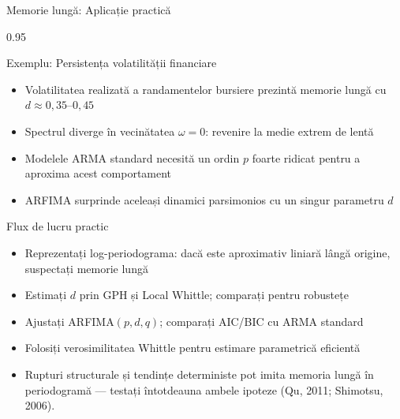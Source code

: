 \documentclass[9pt, aspectratio=169, t]{beamer}
\begin{document}
\begin{frame}{Memorie lungă: Aplicație practică}
    \begin{cminipage}{0.95\textwidth}
    \vspace{-2mm}
    \begin{block}{Exemplu: Persistența volatilității financiare}
        {\small
        \begin{itemize}\setlength{\itemsep}{-1pt}
            \item Volatilitatea realizată a randamentelor bursiere prezintă memorie lungă cu $d \approx 0{,}35$--$0{,}45$
            \item Spectrul diverge în vecinătatea $\omega = 0$: revenire la medie extrem de lentă
            \item Modelele ARMA standard necesită un ordin $p$ foarte ridicat pentru a aproxima acest comportament
            \item ARFIMA surprinde aceleași dinamici parsimonios cu un singur parametru $d$
        \end{itemize}
        }
    \end{block}
    \vspace{-3mm}
    \begin{exampleblock}{Flux de lucru practic}
        \begin{itemize}\setlength{\itemsep}{-1pt}
            \item[\textcolor{MainBlue}{\textbf{1.}}] Reprezentați log-periodograma: dacă este aproximativ liniară lângă origine, suspectați memorie lungă
            \item[\textcolor{MainBlue}{\textbf{2.}}] Estimați $d$ prin GPH și Local Whittle; comparați pentru robustețe
            \item[\textcolor{MainBlue}{\textbf{3.}}] Ajustați ARFIMA$(p,d,q)$; comparați AIC/BIC cu ARMA standard
            \item[\textcolor{MainBlue}{\textbf{4.}}] Folosiți verosimilitatea Whittle pentru estimare parametrică eficientă
        \end{itemize}
    \end{exampleblock}
    \vspace{-2mm}
    \begin{itemize}\setlength{\itemsep}{0pt}
        \item[\textbf{Atenție}:] Rupturi structurale și tendințe deterministe pot imita memoria lungă în periodogramă --- testați întotdeauna ambele ipoteze (Qu, 2011; Shimotsu, 2006).
    \end{itemize}
    \end{cminipage}
\end{frame}
\end{document}
